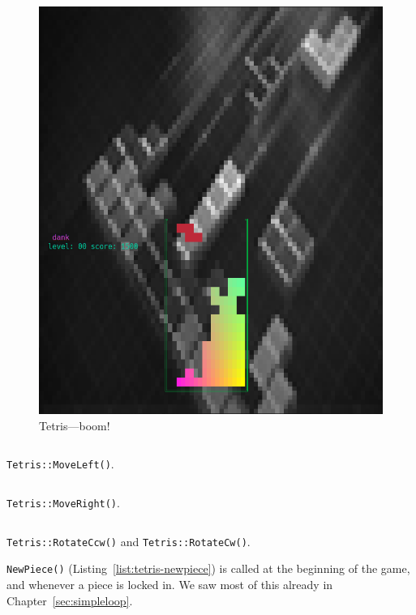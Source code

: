 \begin{figure}
\begin{minipage}{0.45\textwidth}
    \includegraphics[width=1\linewidth]{media/tetris-postscore.png}
    \caption{Tetris---boom!}
  \end{minipage}
\end{figure}

\begin{listing}[!htb]
\inputminted[]{C}{code-tetris/moveleft.h}
\caption{\texttt{Tetris::MoveLeft()}.}
\label{list:tetris-moveleft}
\end{listing}

\begin{listing}[!htb]
\inputminted[]{C}{code-tetris/moveright.h}
\caption{\texttt{Tetris::MoveRight()}.}
\label{list:tetris-moveright}
\end{listing}

\begin{listing}[!htb]
\inputminted[]{C}{code-tetris/rotate.h}
\caption{\texttt{Tetris::RotateCcw()} and \texttt{Tetris::RotateCw()}.}
\label{list:tetris-rotate}
\end{listing}

\texttt{NewPiece()} (Listing~\ref{list:tetris-newpiece}) is called at the
beginning of the game, and whenever a piece is locked in. We saw most of this
already in Chapter~\ref{sec:simpleloop}.

